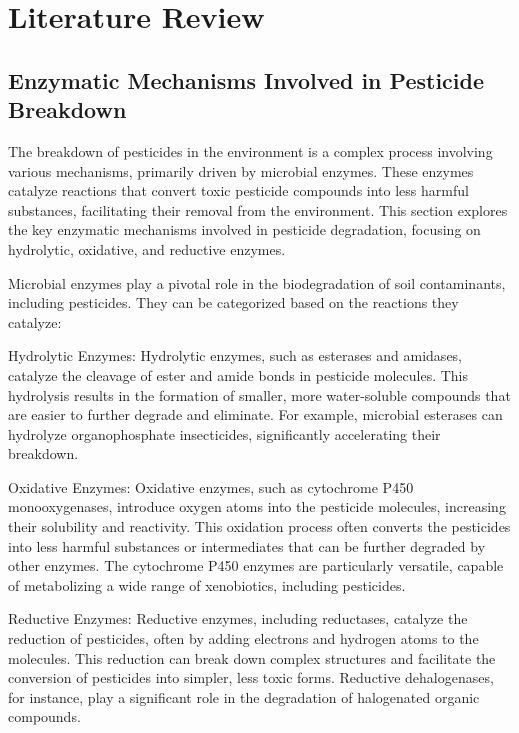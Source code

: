 \section{Literature Review}

\subsection{Enzymatic Mechanisms Involved in Pesticide Breakdown}
\label{sec:Enzymatic Mechanisms Involved in Pesticide Breakdown}

The breakdown of pesticides in the environment is a complex process involving various mechanisms, primarily driven by microbial enzymes. These enzymes catalyze reactions that convert toxic pesticide compounds into less harmful substances, facilitating their removal from the environment. This section explores the key enzymatic mechanisms involved in pesticide degradation, focusing on hydrolytic, oxidative, and reductive enzymes.

Microbial enzymes play a pivotal role in the biodegradation of soil contaminants, including pesticides. They can be categorized based on the reactions they catalyze:

Hydrolytic Enzymes: Hydrolytic enzymes, such as esterases and amidases, catalyze the cleavage of ester and amide bonds in pesticide molecules. This hydrolysis results in the formation of smaller, more water-soluble compounds that are easier to further degrade and eliminate. For example, microbial esterases can hydrolyze organophosphate insecticides, significantly accelerating their breakdown.

Oxidative Enzymes: Oxidative enzymes, such as cytochrome P450 monooxygenases, introduce oxygen atoms into the pesticide molecules, increasing their solubility and reactivity. This oxidation process often converts the pesticides into less harmful substances or intermediates that can be further degraded by other enzymes. The cytochrome P450 enzymes are particularly versatile, capable of metabolizing a wide range of xenobiotics, including pesticides.

Reductive Enzymes: Reductive enzymes, including reductases, catalyze the reduction of pesticides, often by adding electrons and hydrogen atoms to the molecules. This reduction can break down complex structures and facilitate the conversion of pesticides into simpler, less toxic forms. Reductive dehalogenases, for instance, play a significant role in the degradation of halogenated organic compounds.

